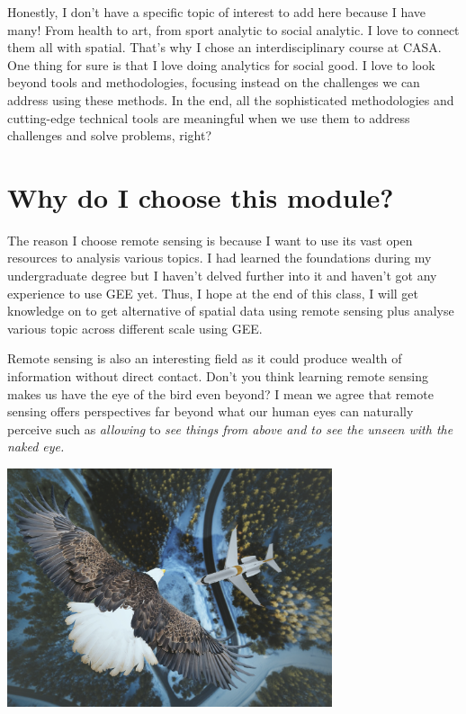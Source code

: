 \documentclass[
  letterpaper,
  DIV=11,
  numbers=noendperiod]{scrreprt}
\begin{document}
Honestly, I don't have a specific topic of interest to add here because
I have many! From health to art, from sport analytic to social analytic.
I love to connect them all with spatial. That's why I chose an
interdisciplinary course at CASA. One thing for sure is that I love
doing analytics for social good. I love to look beyond tools and
methodologies, focusing instead on the challenges we can address using
these methods. In the end, all the sophisticated methodologies and
cutting-edge technical tools are meaningful when we use them to address
challenges and solve problems, right?

\hypertarget{why-do-i-choose-this-module}{%
\section{Why do I choose this
module?}\label{why-do-i-choose-this-module}}

The reason I choose remote sensing is because I want to use its vast
open resources to analysis various topics. I had learned the foundations
during my undergraduate degree but I haven't delved further into it and
haven't got any experience to use GEE yet. Thus, I hope at the end of
this class, I will get knowledge on to get alternative of spatial data
using remote sensing plus analyse various topic across different scale
using GEE.

Remote sensing is also an interesting field as it could produce wealth
of information without direct contact. Don't you think learning remote
sensing makes us have the eye of the bird even beyond? I mean we agree
that remote sensing offers perspectives far beyond what our human eyes
can naturally perceive such as \emph{allowing} to \emph{see things from
above and to see the unseen with the naked eye.}

\includegraphics[width=3.76042in,height=\textheight]{images/clipboard-2217286199.png}
\end{document}
